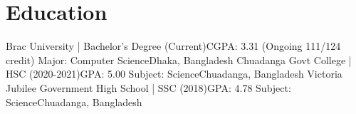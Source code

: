 
\section{\textbf{Education}}
\resumeSubHeadingListStart
    \resumeSubheading
      {Brac University | Bachelor's Degree (Current)}{CGPA: 3.31 (Ongoing 111/124 credit)}
      {Major: Computer Science}{Dhaka, Bangladesh}
    \resumeSubheading
      {Chuadanga Govt College | HSC (2020-2021)}{GPA: 5.00}
      {Subject: Science}{Chuadanga, Bangladesh}
    \resumeSubheading
      {Victoria Jubilee Government High School | SSC (2018)}{GPA: 4.78}
      {Subject: Science}{Chuadanga, Bangladesh}
\resumeSubHeadingListEnd

